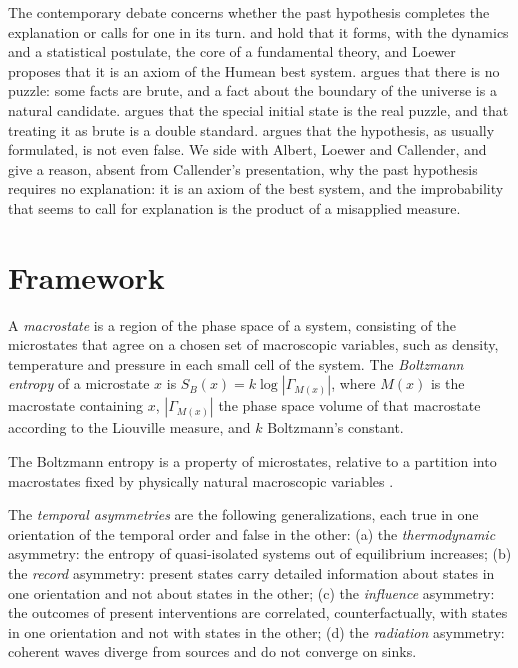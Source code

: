\documentclass{situationist-preprint}
\begin{document}
The contemporary debate concerns whether the past hypothesis completes the explanation or calls for one in its turn. \citet{Albert2000} and \citet{Loewer2007,Loewer2012} hold that it forms, with the dynamics and a statistical postulate, the core of a fundamental theory, and Loewer proposes that it is an axiom of the Humean best system. \citet{Callender2004} argues that there is no puzzle: some facts are brute, and a fact about the boundary of the universe is a natural candidate. \citet{Price1996,Price2004} argues that the special initial state is the real puzzle, and that treating it as brute is a double standard. \citet{Earman2006} argues that the hypothesis, as usually formulated, is not even false. We side with Albert, Loewer and Callender, and give a reason, absent from Callender's presentation, why the past hypothesis requires no explanation: it is an axiom of the best system, and the improbability that seems to call for explanation is the product of a misapplied measure.

\section{Framework}\label{s:framework}

\begin{definition}\label{d:entropy}
A \emph{macrostate} is a region of the phase space of a system, consisting of the microstates that agree on a chosen set of macroscopic variables, such as density, temperature and pressure in each small cell of the system. The \emph{Boltzmann entropy} of a microstate $x$ is $S_B(x)=k\log|\Gamma_{M(x)}|$, where $M(x)$ is the macrostate containing $x$, $|\Gamma_{M(x)}|$ the phase space volume of that macrostate according to the Liouville measure, and $k$ Boltzmann's constant.
\end{definition}

The Boltzmann entropy is a property of microstates, relative to a partition into macrostates fixed by physically natural macroscopic variables \citep{Goldstein2001}.

\begin{definition}\label{d:asym}
The \emph{temporal asymmetries} are the following generalizations, each true in one orientation of the temporal order and false in the other: (a) the \emph{thermodynamic} asymmetry: the entropy of quasi-isolated systems out of equilibrium increases; (b) the \emph{record} asymmetry: present states carry detailed information about states in one orientation and not about states in the other; (c) the \emph{influence} asymmetry: the outcomes of present interventions are correlated, counterfactually, with states in one orientation and not with states in the other; (d) the \emph{radiation} asymmetry: coherent waves diverge from sources and do not converge on sinks.
\end{definition}
\end{document}
